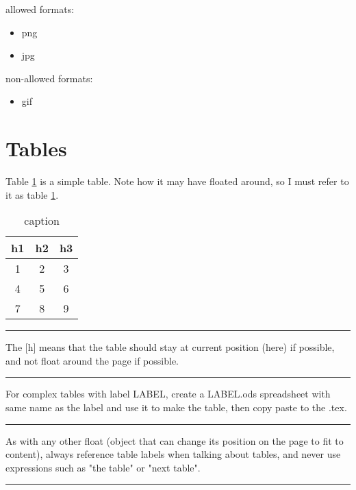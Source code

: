 \documentclass[12pt]{article}
\newcommand{\inOut}[1]{#1}                %
\begin{document}
allowed formats:
\begin{itemize}
  \item png
  \item jpg
\end{itemize}

non-allowed formats:
\begin{itemize}
  \item gif
\end{itemize}

\section{Tables}\label{secTab}

\begin{example} \label{expTab1}
	Table \ref{tab1} is a simple table. Note how it may have floated around, so I must refer to it as table \ref{tab1}.
	\inOut{
		\begin{table}[h]
		  \centering
		  \begin{tabular}{ccc}
        h1 & h2 & h3 \\  		    
		    \hline
		    1 & 2 & 3 \\
		    4 & 5 & 6 \\
		    7 & 8 & 9 \\
		  \end{tabular}
		  \caption{caption}
		  \label{tab1}
		\end{table}
	}
\end{example}\hrule

\begin{remark} \label{remTab1}
  The [h] means that the table should stay at current position (here) if possible, and not float around the page if possible.
\end{remark}\hrule

\begin{remark} \label{remTab2}
  For complex tables with label LABEL, create a LABEL.ods spreadsheet with same name as the label and use it to make the table, then copy paste to the .tex.
\end{remark}\hrule

\begin{remark} \label{remTab3}
  As with any other float (object that can change its position on the page to fit to content), always reference table labels when talking about tables, and never use expressions such as "the table" or "next table".
\end{remark}\hrule
\end{document}
